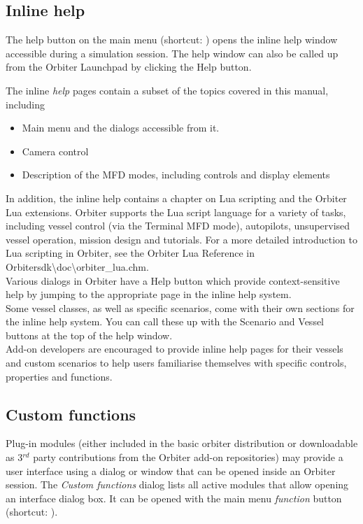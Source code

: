 \documentclass[Orbiter User Manual.tex]{subfiles}
\begin{document}
\subsection{Inline help}
\label{ssec:menu_help}
The help button on the main menu (shortcut: \Ctrl{}) opens the inline help window accessible during a simulation session. The help window can also be called up from the Orbiter Launchpad by clicking the Help button.

\begin{figure}[H]
	\centering
\end{figure}

\noindent
The inline \textit{help} pages contain a subset of the topics covered in this manual, including

\begin{itemize}
\item Main menu and the dialogs accessible from it.
\item Camera control
\item Description of the MFD modes, including controls and display elements
\end{itemize}

\noindent
In addition, the inline help contains a chapter on Lua scripting and the Orbiter Lua extensions. Orbiter supports the Lua script language for a variety of tasks, including vessel control (via the Terminal MFD mode), autopilots, unsupervised vessel operation, mission design and tutorials. For a more detailed introduction to Lua scripting in Orbiter, see the Orbiter Lua Reference in Orbitersdk\textbackslash doc\textbackslash orbiter\_lua.chm.\\
Various dialogs in Orbiter have a Help button which provide context-sensitive help by jumping to the appropriate page in the inline help system.\\
Some vessel classes, as well as specific scenarios, come with their own sections for the inline help system. You can call these up with the Scenario and Vessel buttons at the top of the help window.\\
Add-on developers are encouraged to provide inline help pages for their vessels and custom scenarios to help users familiarise themselves with specific controls, properties and functions.


\subsection{Custom functions}
\label{ssec:menu_cust_func}
Plug-in modules (either included in the basic orbiter distribution or downloadable as 3$^{rd}$ party contributions from the Orbiter add-on repositories) may provide a user interface using a dialog or window that can be opened inside an Orbiter session. The \textit{Custom functions} dialog lists all active modules that allow opening an interface dialog box. It can be opened with the main menu \textit{function} button (shortcut: \Ctrl{}).
\end{document}
